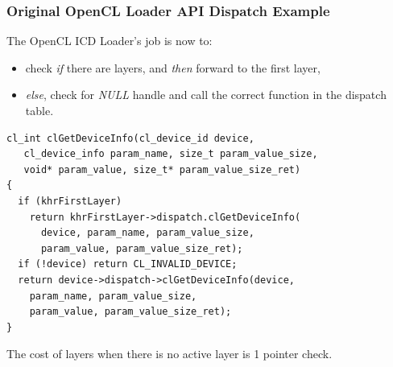 \documentclass{beamer}
\begin{document}


\begin{frame}[fragile]
  \frametitle{Original OpenCL Loader API Dispatch Example}
  The OpenCL ICD Loader's job is now to:
  \begin{itemize}
    \item check \textit{if} there are layers, and \textit{then} forward to the
          first layer,
    \item \textit{else}, check for \textit{NULL} handle and call the correct
          function in the dispatch table.
  \end{itemize}
  \tiny
  \begin{verbatim}
cl_int clGetDeviceInfo(cl_device_id device,
   cl_device_info param_name, size_t param_value_size,
   void* param_value, size_t* param_value_size_ret)
{
  if (khrFirstLayer)
    return khrFirstLayer->dispatch.clGetDeviceInfo(
      device, param_name, param_value_size,
      param_value, param_value_size_ret);
  if (!device) return CL_INVALID_DEVICE;
  return device->dispatch->clGetDeviceInfo(device,
    param_name, param_value_size,
    param_value, param_value_size_ret);
}
\end{verbatim}
\normalsize
The cost of layers when there is no active layer is 1 pointer check.
\end{frame}
\end{document}
